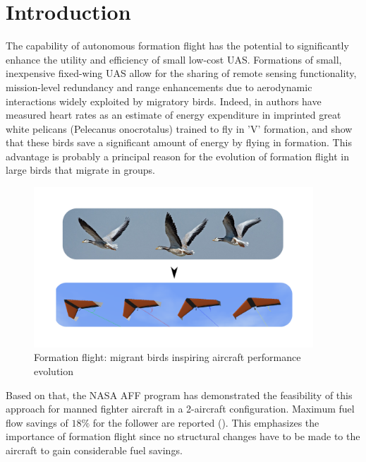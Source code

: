 \documentclass{ifacconf}
\begin{document}
\section{Introduction}
The capability of autonomous formation flight has the potential to significantly enhance the utility and efficiency of small low-cost UAS. 
Formations of small, inexpensive fixed-wing UAS allow for the sharing of remote sensing functionality, mission-level redundancy and range enhancements due to aerodynamic 
interactions widely exploited by migratory birds. 
Indeed, in \cite{weimerskirch2001energy} authors have measured heart rates as an estimate of energy expenditure in imprinted great white pelicans (Pelecanus onocrotalus) trained to fly in 'V' formation, and show that these birds save a significant amount of energy by flying in formation. This advantage is probably a principal reason for the evolution of formation flight in large birds that migrate in groups.\\
\begin{figure}
\begin{center}
\includegraphics[width=\columnwidth,height=6cm]{juppmehrbionik}    %
\vspace{-1cm}
\caption{Formation flight: migrant birds inspiring aircraft performance evolution}
\label{fig:birds}
\end{center}
\end{figure}
Based on that, the NASA AFF program has demonstrated the feasibility of this approach for manned fighter aircraft in a 2-aircraft configuration. Maximum fuel flow savings of $18\%$ for the follower are reported (\cite{Vachon2002}). This emphasizes the importance of formation flight since no structural changes have to be made to the aircraft to gain considerable fuel savings.\\
\end{document}
